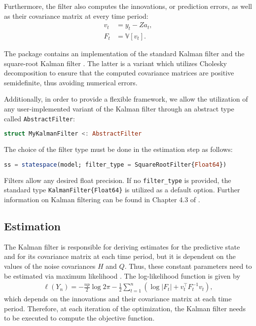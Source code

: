 \documentclass{juliacon}
\begin{document}
Furthermore, the filter also computes the innovations, or prediction errors, as well as their covariance matrix at every time period:
%
\begin{align}
    v_{t} &= y_{t} - Z a_{t}, \\
    F_{t} &= \mathbb{V}[v_{t}].
\end{align}
%

The package contains an implementation of the standard Kalman filter and the square-root Kalman filter \cite{durbin2012time}. The latter is a variant which utilizes Cholesky decomposition to ensure that the computed covariance matrices are positive semidefinite, thus avoiding numerical errors.

Additionally, in order to provide a flexible framework, we allow the utilization of any user-implemented variant of the Kalman filter through an abstract type called \texttt{AbstractFilter}:
%
\begin{lstlisting}[language = Julia]
struct MyKalmanFilter <: AbstractFilter
\end{lstlisting}

The choice of the filter type must be done in the estimation step as follows:
%
\begin{lstlisting}[language = Julia]
ss = statespace(model; filter_type = SquareRootFilter{Float64})
\end{lstlisting}

Filters allow any desired float precision. If no \texttt{filter\_type} is provided, the standard type \texttt{KalmanFilter\{Float64\}} is utilized as a default option. Further information on Kalman filtering can be found in Chapter 4.3 of \cite{durbin2012time}.

\subsection{Estimation}

The Kalman filter is responsible for deriving estimates for the predictive state and for its covariance matrix at each time period, but it is dependent on the values of the noise covariances $H$ and $Q$. Thus, these constant parameters need to be estimated via maximum likelihood \cite{casella2002statistical}. The log-likelihood function is given by
%
\begin{align}
    \ell(Y_{n}) = -\frac{np}{2} \log 2 \pi - \frac{1}{2} \sum_{t=1}^{n} (\log |F_{t}| + v_{t}^{\top} F_{t}^{-1} v_{t}),
\end{align}
%
which depends on the innovations and their covariance matrix at each time period. Therefore, at each iteration of the optimization, the Kalman filter needs to be executed to compute the objective function.
\end{document}
